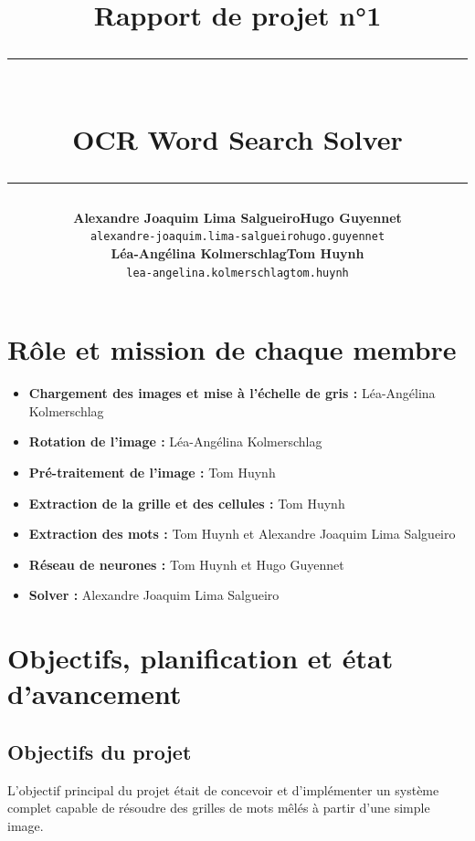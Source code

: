 \documentclass{article}
\title{
\vspace{6cm}
\textbf{Rapport de projet n°1}\\
\rule{0.65\linewidth}{3pt}\\[0.7em]  %
\textbf{OCR Word Search Solver}\\[0.5em]
\rule{0.65\linewidth}{1pt}           %
}
\author{
    \begin{tabular}{cc}
        \textbf{Alexandre Joaquim Lima Salgueiro} & \textbf{Hugo Guyennet} \\
        \texttt{alexandre-joaquim.lima-salgueiro} & \texttt{hugo.guyennet} \\[2ex]
        \textbf{Léa-Angélina Kolmerschlag} & \textbf{Tom Huynh} \\
        \texttt{lea-angelina.kolmerschlag} & \texttt{tom.huynh}
    \end{tabular}
}
\date{}
\begin{document}
\maketitle
\thispagestyle{empty}
\newpage
\begin{spacing}{0.9}
\tableofcontents
\end{spacing}
\newpage


\section{Rôle et mission de chaque membre}

\begin{itemize}
    \item \textbf{Chargement des images et mise à l'échelle de gris :} Léa-Angélina Kolmerschlag
    \item \textbf{Rotation de l'image :} Léa-Angélina Kolmerschlag
    \item \textbf{Pré-traitement de l'image :} Tom Huynh
    \item \textbf{Extraction de la grille et des cellules :} Tom Huynh
    \item \textbf{Extraction des mots :} Tom Huynh et Alexandre Joaquim Lima Salgueiro
    \item \textbf{Réseau de neurones :} Tom Huynh et Hugo Guyennet
    \item \textbf{Solver :} Alexandre Joaquim Lima Salgueiro
\end{itemize}

\section{Objectifs, planification et état d'avancement}

\subsection{Objectifs du projet}
L'objectif principal du projet était de concevoir et d'implémenter un système complet capable de résoudre des grilles de mots mêlés à partir d'une simple image.
\end{document}
